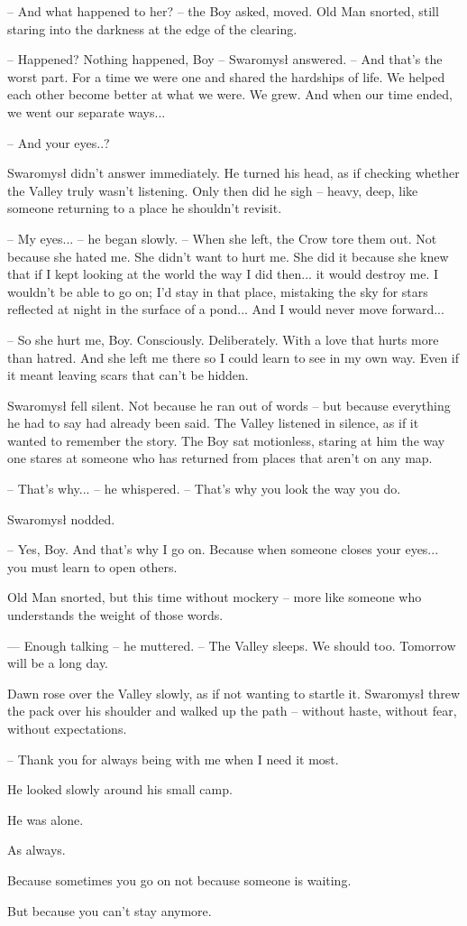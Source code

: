 \par\noindent-- And what happened to her? -- the Boy asked, moved. Old Man snorted, still staring into the darkness at the edge of the clearing. 
\par\noindent-- Happened? Nothing happened, Boy -- Swaromysł answered. -- And that's the worst part. For a time we were one and shared the hardships of life. We helped each other become better at what we were. We grew. And when our time ended, we went our separate ways... 
\par\noindent-- And your eyes..? 
\par\indent Swaromysł didn't answer immediately. He turned his head, as if checking whether the Valley truly wasn't listening. Only then did he sigh -- heavy, deep, like someone returning to a place he shouldn't revisit. 
\par\noindent-- My eyes... -- he began slowly. -- When she left, the Crow tore them out. Not because she hated me. She didn't want to hurt me. She did it because she knew that if I kept looking at the world the way I did then... it would destroy me. I wouldn't be able to go on; I'd stay in that place, mistaking the sky for stars reflected at night in the surface of a pond... And I would never move forward... 
\par\noindent-- So she hurt me, Boy. Consciously. Deliberately. With a love that hurts more than hatred. And she left me there so I could learn to see in my own way. Even if it meant leaving scars that can't be hidden. 
\par\indent Swaromysł fell silent. Not because he ran out of words -- but because everything he had to say had already been said. The Valley listened in silence, as if it wanted to remember the story. The Boy sat motionless, staring at him the way one stares at someone who has returned from places that aren't on any map. 
\par\noindent-- That's why... -- he whispered. -- That's why you look the way you do. 
\par\noindent Swaromysł nodded. 
\par\noindent-- Yes, Boy. And that's why I go on. Because when someone closes your eyes... you must learn to open others. 
\par\noindent Old Man snorted, but this time without mockery -- more like someone who understands the weight of those words. 
\par\noindent--- Enough talking -- he muttered. -- The Valley sleeps. We should too. Tomorrow will be a long day. 
\par\indent Dawn rose over the Valley slowly, as if not wanting to startle it. Swaromysł threw the pack over his shoulder and walked up the path -- without haste, without fear, without expectations. 
\par\noindent-- Thank you for always being with me when I need it most. 
\par\noindent He looked slowly around his small camp. 
\par\noindent He was alone. 
\par\noindent As always. 
\par\noindent Because sometimes you go on not because someone is waiting. 
\par\noindent But because you can't stay anymore.